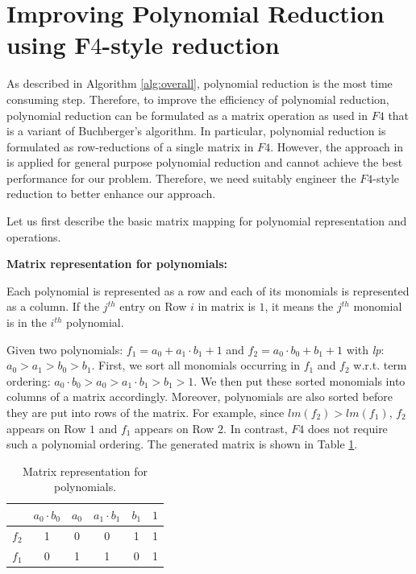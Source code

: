 \section{Improving Polynomial Reduction using F$4$-style reduction}
As described in Algorithm \ref{alg:overall}, polynomial reduction is the most time consuming step. 
Therefore, to improve the efficiency of polynomial reduction, 
polynomial reduction can be formulated as a matrix operation as used in $F4$ \cite{f4} that is a variant of Buchberger's algorithm. 
In particular, polynomial reduction is formulated as row-reductions of a single matrix in $F4$.
However, the approach in \cite{f4} is applied for general purpose polynomial reduction and cannot achieve the best 
performance for our problem. 
Therefore, we need suitably engineer the $F4$-style reduction to better enhance our approach.

Let us first describe the basic matrix mapping for polynomial representation and operations.

{\bf Matrix representation for polynomials:}

Each polynomial is represented as a row and each of its monomials is represented as a column.
If the $j^{th}$ entry on Row $i$ in matrix is $1$, it means the $j^{th}$ monomial is in the $i^{th}$ polynomial.
 
\begin{Example}
	Given two polynomials: $f_{1}=a_{0}+a_{1}\cdot b_{1}+1$ and $f_{2}=a_{0}\cdot b_{0}+b_{1}+1$ with {\it lp}: $a_{0}>a_{1}>b_{0}>b_{1}$.
	First, we sort all monomials occurring in $f_{1}$ and $f_{2}$ w.r.t. term ordering: $a_{0}\cdot b_{0} >a_{0}>a_{1}\cdot b_{1}> b_{1}>1$.
	We then put these sorted monomials into columns of a matrix accordingly. Moreover, polynomials are also sorted before they are put
	into rows of the matrix. For example, since $lm(f_{2})>lm(f_{1})$, $f_{2}$ appears on Row $1$ and $f_{1}$ appears on Row $2$.
	In contrast, $F4$ does not require such a polynomial ordering. The generated matrix is shown in Table \ref{tab:matrix}.
	\begin{table}[htb]
	\begin{center}
	\caption{Matrix representation for polynomials.}
	\label{tab:matrix}
	\begin{tabular}{|c|c|c|c|c|c|} \hline 
			&$a_{0}\cdot b_{0}$  	&$a_{0}$ 	&$a_{1}\cdot b_{1}$		&$b_{1}$ 	&$1$  \\
	\hline 
	$f_{2}$ & 1 &0 & 0 & 1 & 1 \\
	\hline
	$f_{1}$ & 0 &1 & 1 & 0 & 1 \\
	\hline
	\end{tabular}
	\end{center}
	\end{table}
\end{Example}	

